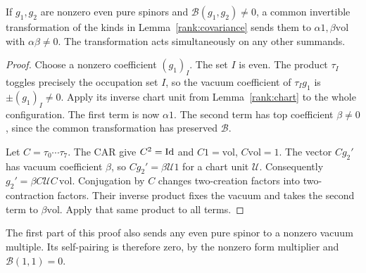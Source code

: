 \begin{lemma}\label{rank:common-pair}
If $g_1,g_2$ are nonzero even pure spinors and
$\mathcal B(g_1,g_2)\ne0$, a common invertible transformation of the kinds
in Lemma~\ref{rank:covariance} sends them to
$\alpha1,\beta\mathrm{vol}$ with $\alpha\beta\ne0$.
The transformation acts simultaneously on any other summands.
\end{lemma}
\begin{proof}
Choose a nonzero coefficient $(g_1)_I$. The set $I$ is even.
The product $\tau_I$ toggles precisely the occupation set $I$, so the
vacuum coefficient of $\tau_Ig_1$ is $\pm(g_1)_I\ne0$.
Apply its inverse chart unit from Lemma~\ref{rank:chart} to the whole
configuration. The first term is now $\alpha1$.
The second term has top coefficient $\beta\ne0$, since the common
transformation has preserved $\mathcal B$.

Let $C=\tau_0\cdots\tau_7$. The CAR give $C^2=\mathrm{Id}$ and
$C1=\mathrm{vol}$, $C\mathrm{vol}=1$.
The vector $Cg_2'$ has vacuum coefficient $\beta$, so
$Cg_2'=\beta\mathcal U1$ for a chart unit $\mathcal U$.
Consequently $g_2'=\beta C\mathcal UC\,\mathrm{vol}$.
Conjugation by $C$ changes two-creation factors into two-contraction
factors. Their inverse product fixes the vacuum and takes the second
term to $\beta\mathrm{vol}$. Apply that same product to all terms.
\end{proof}

The first part of this proof also sends any even pure spinor to a
nonzero vacuum multiple. Its self-pairing is therefore zero, by the
nonzero form multiplier and $\mathcal B(1,1)=0$.


